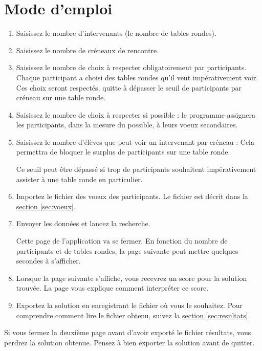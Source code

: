\documentclass[11pt,a4paper]{article}
\begin{document}
\section{Mode d'emploi}
\label{sec:emploi}
\begin{enumerate}
  \item Saisissez le nombre d'intervenants (le nombre de tables rondes).
  \item Saisissez le nombre de créneaux de rencontre.
  \item Saisissez le nombre de choix à respecter obligatoirement par participants. Chaque participant a choisi des tables rondes qu'il veut impérativement voir. Ces choix seront respectés, quitte à dépasser le seuil de participants par créneau sur une table ronde.
  \item Saisissez le nombre de choix à respecter si possible : le programme assignera les participants, dans la mesure du possible, à leurs voeux secondaires.
  \item Saisissez le nombre d'élèves que peut voir un intervenant par créneau : Cela permettra de bloquer le surplus de participants sur une table ronde. \begin{attention} Ce seuil peut être dépassé si trop de participants souhaitent impérativement assister à une table ronde en particulier. \end{attention}
  \item Importez le fichier des voeux des participants. Le fichier est décrit dans la \hyperref[sec:voeux]{section \ref{sec:voeux}}.
  \item Envoyer les données et lancez la recherche. \begin{note}Cette page de l'application va se fermer. En fonction du nombre de participants et de tables rondes, la page suivante peut mettre quelques secondes à s'afficher.\end{note}
  \item Lorsque la page suivante s'affiche, vous recevrez un score pour la solution trouvée. La page vous explique comment interpréter ce score.
  \item Exportez la solution en enregistrant le fichier où vous le souhaitez. Pour comprendre comment lire le fichier obtenu, suivez la \hyperref[sec:resultats]{section \ref{sec:resultats}}.
\end{enumerate}

\begin{danger}
Si vous fermez la deuxième page avant d'avoir exporté le fichier résultats, vous perdrez la solution obtenue. Pensez à bien exporter la solution avant de quitter.
\end{danger}
\end{document}
